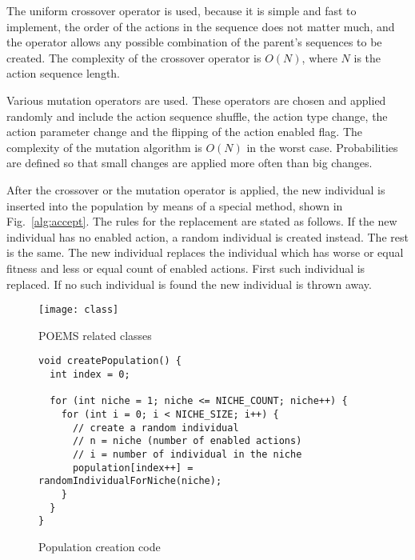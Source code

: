 The uniform crossover operator is used, because it is simple and fast to implement, the order of the actions in the sequence does not matter much, and the operator allows any possible combination of the parent's sequences to be created. The complexity of the crossover operator is $O(N)$, where $N$ is the action sequence length.

Various mutation operators are used. These operators are chosen and applied randomly and include the action sequence shuffle, the action type change, the action parameter change and the flipping of the action enabled flag. The complexity of the mutation algorithm is $O(N)$ in the worst case. Probabilities are defined so that small changes are applied more often than big changes.

After the crossover or the mutation operator is applied, the new individual is inserted into the population by means of a special method, shown in Fig.~\ref{alg:accept}. The rules for the replacement are stated as follows. If the new individual has no enabled action, a random individual is created instead. The rest is the same. The new individual replaces the individual which has worse or equal fitness and less or equal count of enabled actions. First such individual is replaced. If no such individual is found the new individual is thrown away.

\begin{figure}
\centering
\texttt{[image: class]}
\caption{POEMS related classes}
\label{fig:uml:poems}
\end{figure}

\begin{figure}
\centering
\begin{lstlisting}
void createPopulation() {
  int index = 0;

  for (int niche = 1; niche <= NICHE_COUNT; niche++) {
    for (int i = 0; i < NICHE_SIZE; i++) {
      // create a random individual
      // n = niche (number of enabled actions)
      // i = number of individual in the niche
      population[index++] = randomIndividualForNiche(niche);
    }
  }
}
\end{lstlisting}
\caption{Population creation code}
\label{alg:create}
\end{figure}

